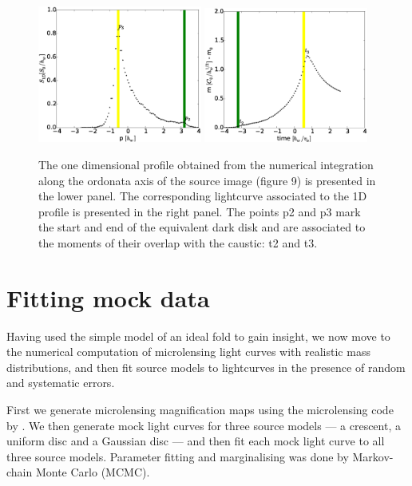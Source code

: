 \documentclass[usenatbib]{mn2e}
\begin{document}
\begin{figure}
\centering
	\includegraphics[width = 0.48\textwidth]{figures/M87_shape.eps}
        \includegraphics[width = 0.48\textwidth]{figures/M87_lc.eps}
\caption{\label{fig:M87_plots} The one dimensional profile obtained
  from the numerical integration along the ordonata axis of the source
  image (figure 9) is presented in the lower panel. The corresponding
  lightcurve associated to the 1D profile is presented in the right
  panel. The points p2 and p3 mark the start and end of the equivalent
  dark disk and are associated to the moments of their overlap with
  the caustic: t2 and t3.}
\end{figure}

\section{Fitting mock data}\label{sec:numerics}

Having used the simple model of an ideal fold to gain insight, we now
move to the numerical computation of microlensing light curves with
realistic mass distributions, and then fit source models to
lightcurves in the presence of random and systematic errors.

First we generate microlensing magnification maps using the
microlensing code by \cite{1999A&A...346L...5W}.  We then generate
mock light curves for three source models --- a crescent, a uniform
disc and a Gaussian disc --- and then fit each mock light curve to all
three source models. Parameter fitting and marginalising was done by
Markov-chain Monte Carlo (MCMC).
\end{document}
